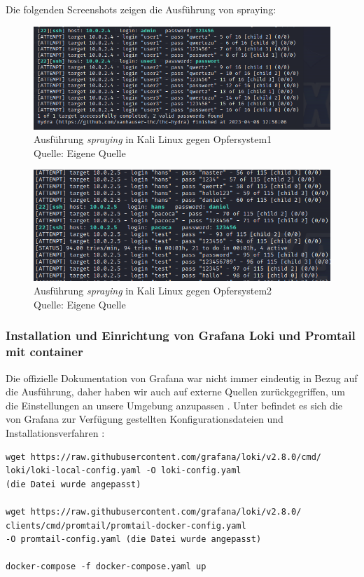 \newpage
Die folgenden Screenshots zeigen die Ausführung von \gls{spraying}:
\begin{figure}[H]
   \centering
   \includegraphics[width=1\textwidth]{assets/Spraying_Kali.png}
   \caption{Ausführung \textit{\gls{spraying}} in Kali Linux gegen Opfersystem1\\Quelle: Eigene Quelle}
   \centering
\end{figure}

\begin{figure}[H]
   \centering
   \includegraphics[width=1\textwidth]{assets/Spraying_Kali2.png}
   \caption{Ausführung \textit{\gls{spraying}} in Kali Linux gegen Opfersystem2\\Quelle: Eigene Quelle}
   \centering
\end{figure}

\newpage
\subsubsection{Installation und Einrichtung von Grafana Loki und Promtail mit \gls{container}}
Die offizielle Dokumentation von Grafana war nicht immer eindeutig in Bezug auf die Ausführung, daher haben wir auch auf externe Quellen zurückgegriffen, um die Einstellungen an unsere Umgebung anzupassen \citep{Polinowski_PGL}. Unter befindet es sich die von Grafana zur Verfügung gestellten Konfigurationsdateien und Installationsverfahren \citep{GrafanaLoki_run}:


{
\begin{lstlisting}[frame=single]
wget https://raw.githubusercontent.com/grafana/loki/v2.8.0/cmd/
loki/loki-local-config.yaml -O loki-config.yaml
(die Datei wurde angepasst)

wget https://raw.githubusercontent.com/grafana/loki/v2.8.0/
clients/cmd/promtail/promtail-docker-config.yaml
-O promtail-config.yaml (die Datei wurde angepasst)

docker-compose -f docker-compose.yaml up 
\end{lstlisting}
}

